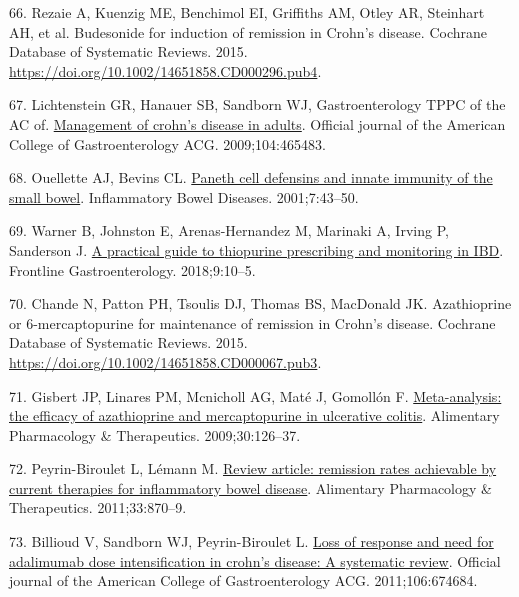 \documentclass[
  12pt,
  a4paper,
  twoside,
  openright]{book}
\newlength{\cslhangindent}
\newlength{\cslentryspacingunit} %
\newenvironment{CSLReferences}[2] %
 {%
  \setlength{\parindent}{0pt}
  \ifodd #1
  \let\oldpar\par
  \def\par{\hangindent=\cslhangindent\oldpar}
  \fi
  \setlength{\parskip}{#2\cslentryspacingunit}
 }%
 {}
\begin{document}
\begin{CSLReferences}{0}{0}
\leavevmode{}%
66. Rezaie A, Kuenzig ME, Benchimol EI, Griffiths AM, Otley AR, Steinhart AH, et al. Budesonide for induction of remission in Crohn's disease. Cochrane Database of Systematic Reviews. 2015. \url{https://doi.org/10.1002/14651858.CD000296.pub4}.

\leavevmode{}%
67. Lichtenstein GR, Hanauer SB, Sandborn WJ, Gastroenterology TPPC of the AC of. \href{https://journals.lww.com/ajg/Abstract/2009/02000/Management_of_Crohn_s_Disease_in_Adults.32.aspx}{Management of crohn's disease in adults}. Official journal of the American College of Gastroenterology \textbar{} ACG. 2009;104:465483.

\leavevmode{}%
68. Ouellette AJ, Bevins CL. \href{https://doi.org/10.1097/00054725-200102000-00007}{Paneth cell defensins and innate immunity of the small bowel}. Inflammatory Bowel Diseases. 2001;7:43--50.

\leavevmode{}%
69. Warner B, Johnston E, Arenas-Hernandez M, Marinaki A, Irving P, Sanderson J. \href{https://doi.org/10.1136/flgastro-2016-100738}{A practical guide to thiopurine prescribing and monitoring in IBD}. Frontline Gastroenterology. 2018;9:10--5.

\leavevmode{}%
70. Chande N, Patton PH, Tsoulis DJ, Thomas BS, MacDonald JK. Azathioprine or 6{-}mercaptopurine for maintenance of remission in Crohn's disease. Cochrane Database of Systematic Reviews. 2015. \url{https://doi.org/10.1002/14651858.CD000067.pub3}.

\leavevmode{}%
71. Gisbert JP, Linares PM, Mcnicholl AG, Maté J, Gomollón F. \href{https://doi.org/10.1111/j.1365-2036.2009.04023.x}{Meta-analysis: the efficacy of azathioprine and mercaptopurine in ulcerative colitis}. Alimentary Pharmacology \& Therapeutics. 2009;30:126--37.

\leavevmode{}%
72. Peyrin-Biroulet L, Lémann M. \href{https://doi.org/10.1111/j.1365-2036.2011.04599.x}{Review article: remission rates achievable by current therapies for inflammatory bowel disease}. Alimentary Pharmacology \& Therapeutics. 2011;33:870--9.

\leavevmode{}%
73. Billioud V, Sandborn WJ, Peyrin-Biroulet L. \href{https://doi.org/10.1038/ajg.2011.60}{Loss of response and need for adalimumab dose intensification in crohn's disease: A systematic review}. Official journal of the American College of Gastroenterology \textbar{} ACG. 2011;106:674684.


\end{CSLReferences}
\end{document}
